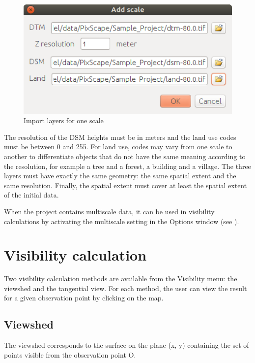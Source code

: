 \documentclass{report}
\begin{document}
\begin{figure}[H]
	\includegraphics[scale=0.5]{img/add_scale-en.png} 
	\caption{Import layers for one scale}
\end{figure}

The resolution of the DSM heights must be in meters and the land use codes must be between 0 and 255. For land use, codes may vary from one scale to another to differentiate objects that do not have the same meaning according to the resolution, for example a tree and a forest, a building and a village.
The three layers must have exactly the same geometry: the same spatial extent and the same resolution.
Finally, the spatial extent must cover at least the spatial extent of the initial data.

When the project contains multiscale data, it can be used in visibility calculations by activating the multiscale setting in the Options window (see ).


\section{Visibility calculation}

Two visibility calculation methods are available from the Visibility menu: the viewshed and the tangential view.
For each method, the user can view the result for a given observation point by clicking on the map.

\subsection{Viewshed}
The viewshed corresponds to the surface on the plane (x, y) containing the set of points visible from the observation point O.
\end{document}
